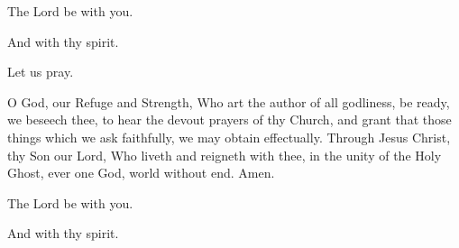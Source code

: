 

\rubric{\Vbar}The Lord be with you.

\rubric{\Rbar}And with thy spirit.

Let us pray.

O God, our Refuge and Strength, Who art the author of all godliness, be ready, we beseech thee, to hear the devout prayers of thy Church, and grant that those things which we ask faithfully, we may obtain effectually. Through Jesus Christ, thy Son our Lord, Who liveth and reigneth with thee, in the unity of the Holy Ghost, ever one God, world without end. \rubric{\Rbar} Amen.

\rubric{\Vbar}The Lord be with you.

\rubric{\Rbar}And with thy spirit.
